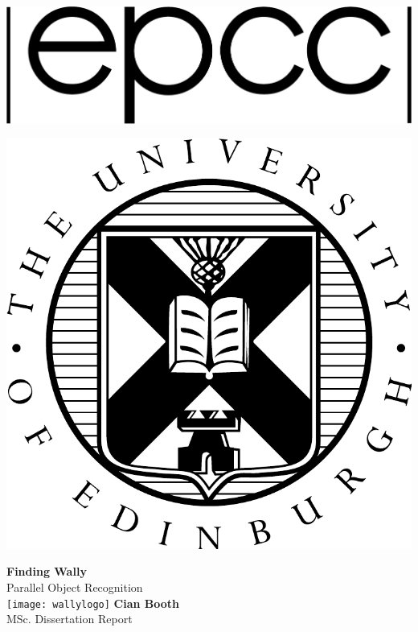 \documentclass[a4paper,12pt]{article}
\author{Cian Booth: \textbf{s1256705}}
\def\biblio {
  
  
}
\begin{document}
  \def\biblio{}
  \begin{minipage}{0.75\textwidth}
    \resizebox{72pt}{!} {
      \includegraphics{logos/logo_black}
    }
  \end{minipage}
  \begin{minipage}{0.2\textwidth}
    \resizebox{72pt}{!} {
      \includegraphics{logos/eucrest}
    }
  \end{minipage}
  \begin{center}
    \textbf{\Huge Finding Wally}\\
    {\Large Parallel Object Recognition}\\
    \vfill
    \texttt{[image: wallylogo]}
    \vfill
    {\huge \textbf{Cian Booth}}\\
    {\large MSc. Dissertation Report}\\
    \vspace{1em}
  \end{center}
  \pagestyle{empty}
  \pagebreak
  \pagebreak
  \tableofcontents
  \pagebreak
  \listoffigures
  \pagebreak
  \listoftables
  \pagebreak
  \listoflistings
  \pagestyle{empty}
  \pagebreak
\end{document}
